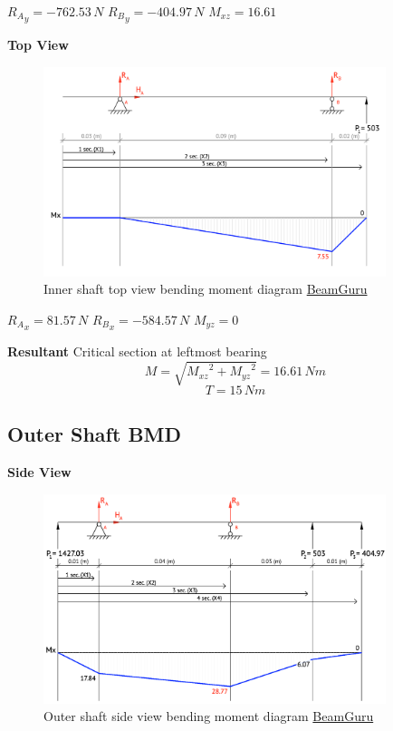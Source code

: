\documentclass[11pt, titlepage]{article}
\begin{document}
${R_{A}}_y = -762.53\,N$ \hfill
${R_{B}}_y = -404.97\,N$\hfill
$M_{xz}=16.61$\newline

\noindent\textbf{Top View}
\begin{figure}[h]
\centering
	\includegraphics[width=10cm]{inner_shaft_top_bmd.png}
	\caption{Inner shaft top view bending moment diagram \href{beamguru.com/online/beam-calculator/?save=88759fc0e73600b1a941d8defae4d6b8}{BeamGuru}}
\end{figure}

${R_{A}}_x = 81.57\,N$ \hfill
${R_{B}}_x = -584.57\,N$\hfill
$M_{yz}=0$\newline

\noindent\textbf{Resultant}\newline
Critical section at leftmost bearing
$$M = \sqrt{{M_{xz}}^2 + {M_{yz}}^2} = 16.61\,Nm$$
$$T = 15\,Nm$$


\newpage
\subsection{Outer Shaft BMD}
\noindent\textbf{Side View}
\begin{figure}[h]
\centering
	\includegraphics[width=10cm]{outer_shaft_side_bmd.png}
	\caption{Outer shaft side view bending moment diagram \href{beamguru.com/online/beam-calculator/?save=e3c807530bc8028842f255e179b1241b}{BeamGuru}}
\end{figure}
\end{document}
